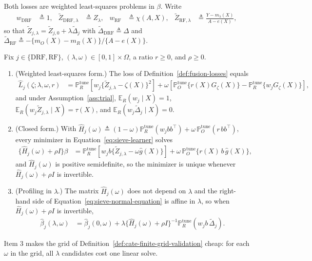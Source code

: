 Both losses are weighted least-squares problems in $\beta$. Write
\begin{align}
w_{\mathrm{DRF}}&\triangleq1,
&
\widetilde Z_{\mathrm{DRF},\lambda}&\triangleq Z_\lambda,
&
w_{\mathrm{RF}}&\triangleq\chi(A,X),
&
\widetilde Z_{\mathrm{RF},\lambda}&\triangleq\frac{Y-m_\lambda(X)}{A-e(X)},
\label{eq:sieve-weights}
\end{align}
so that $\widetilde Z_{j,\lambda}=\widetilde Z_{j,0}+\lambda\widetilde\Delta_j$ with $\widetilde\Delta_{\mathrm{DRF}}\triangleq\Delta$ and $\widetilde\Delta_{\mathrm{RF}}\triangleq-\{m_O(X)-m_R(X)\}/\{A-e(X)\}$.

\begin{proposition}
\label{prop:sieve-closed-form}
Fix $j\in\{\mathrm{DRF},\mathrm{RF}\}$, $(\lambda,\omega)\in[0,1]\times\Omega$, a ratio $r\geq0$, and $\rho\geq0$.
\begin{enumerate}
\item (Weighted least-squares form.) The loss of Definition~\ref{def:fusion-losses} equals
\begin{align}
\widehat L_j(\zeta;\lambda,\omega,r)
&=\mathbb P_R^{\mathrm{tune}}\left[w_j\{\widetilde Z_{j,\lambda}-\zeta(X)\}^2\right]
+\omega\left[\mathbb P_O^{\mathrm{tune}}\{r(X)G_\zeta(X)\}-\mathbb P_R^{\mathrm{tune}}\{w_jG_\zeta(X)\}\right],
\label{eq:sieve-wls-form}
\end{align}
and under Assumption~\ref{ass:trial}, $\mathbb E_R(w_j\mid X)=1$, $\mathbb E_R(w_j\widetilde Z_{j,\lambda}\mid X)=\tau(X)$, and $\mathbb E_R(w_j\widetilde\Delta_j\mid X)=0$.
\item (Closed form.) With $\widehat H_j(\omega)\triangleq(1-\omega)\mathbb P_R^{\mathrm{tune}}(w_jbb^\top)+\omega\,\mathbb P_O^{\mathrm{tune}}(r\,bb^\top)$, every minimizer in Equation~\eqref{eq:sieve-learner} solves
\begin{align}
\{\widehat H_j(\omega)+\rho I\}\beta
&=\mathbb P_R^{\mathrm{tune}}\left[w_jb\{\widetilde Z_{j,\lambda}-\omega\widehat g(X)\}\right]+\omega\,\mathbb P_O^{\mathrm{tune}}\{r(X)\,b\,\widehat g(X)\},
\label{eq:sieve-normal-equation}
\end{align}
and $\widehat H_j(\omega)$ is positive semidefinite, so the minimizer is unique whenever $\widehat H_j(\omega)+\rho I$ is invertible.
\item (Profiling in $\lambda$.) The matrix $\widehat H_j(\omega)$ does not depend on $\lambda$ and the right-hand side of Equation~\eqref{eq:sieve-normal-equation} is affine in $\lambda$, so when $\widehat H_j(\omega)+\rho I$ is invertible,
\begin{align}
\widehat\beta_j(\lambda,\omega)
&=\widehat\beta_j(0,\omega)+\lambda\{\widehat H_j(\omega)+\rho I\}^{-1}\mathbb P_R^{\mathrm{tune}}(w_jb\,\widetilde\Delta_j).
\label{eq:sieve-lambda-path}
\end{align}
\end{enumerate}
\end{proposition}
Item 3 makes the grid of Definition~\ref{def:cate-finite-grid-validation} cheap: for each $\omega$ in the grid, all $\lambda$ candidates cost one linear solve.

